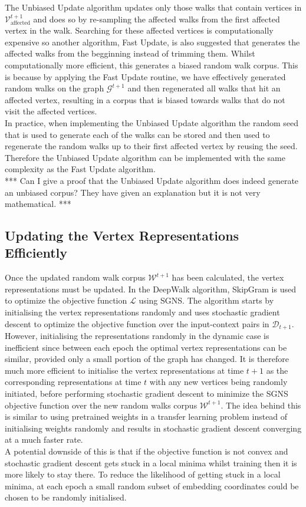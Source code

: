 \documentclass[a4paper]{article}
\newcommand{\D}{\mathcal D}
\renewcommand{\G}{\mathcal G}
\renewcommand{\V}{\mathcal V}
\newcommand{\W}{\mathcal W}
\begin{document}
The Unbiased Update algorithm updates only those walks that contain vertices in
$\V^{t+1}_{\text{affected}}$ and does so by re-sampling the affected walks from
the first affected vertex in the walk. Searching for these affected vertices is computationally expensive so another algorithm,
Fast Update, is also suggested that generates the affected walks from the
begginning instead of trimming them. Whilst computationally more efficient, this
generates a biased random walk corpus. This is because by applying the Fast Update routine, we have
effectively generated random walks on the graph $\G^{t+1}$ and then regenerated
all walks that hit an affected vertex, resulting in a corpus that is biased towards walks
that do not visit the affected vertices.\\
In practice, when implementing the Unbiased Update algorithm the random seed
that is used to generate each of the walks can be stored and then used to
regenerate the random walks up to their first affected vertex by reusing the
seed. Therefore the Unbiased Update algorithm can be implemented with the same
complexity as the Fast Update algorithm.\\
*** Can I give a proof that the Unbiased Update algorithm does indeed generate
an unbiased corpus? They have given an explanation but it is not very
mathematical. ***\\

\subsection{Updating the Vertex Representations Efficiently}
Once the updated random walk corpus $\W^{t+1}$ has been calculated, the vertex
representations must be updated. In the DeepWalk algorithm, SkipGram is used to
optimize the objective function $\mathcal{L}$ using SGNS.
The algorithm starts by initialising the vertex representations randomly and
uses stochastic gradient descent to optimize the objective function over the
input-context pairs in $\D_{t+1}$.\\
However, initialising the representations randomly in the dynamic case is
inefficient since between each epoch the optimal vertex representations can be similar, provided only a small portion of the graph has changed. It is therefore much more efficient to initialise the vertex
representations at time $t+1$ as the corresponding representations at time $t$
with any new vertices being randomly initiated, before performing stochastic gradient
descent to minimize the SGNS objective function over the new random walks corpus
$\W^{t+1}$. The idea behind this is similar to using pretrained weights in a transfer
learning problem instead of initialising weights randomly and results in
stochastic gradient descent converging at a much faster rate.\\
A potential downside of this is that if the objective function is not convex and
stochastic gradient descent gets stuck in a local minima whilst training then it
is more likely to stay there. To reduce the likelihood of getting stuck in a local
minima, at each epoch a small random subset of embedding coordinates could be chosen to be randomly initialised.
\end{document}
